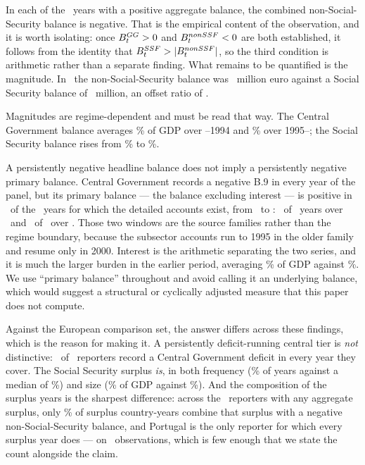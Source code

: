 In each of the \NumPositiveYears\ years with a positive aggregate balance, the
combined non-Social-Security balance is negative. That is the empirical content of
the observation, and it is worth isolating: once $B^{GG}_t > 0$ and $B^{nonSSF}_t < 0$
are both established, it follows from the identity that
$B^{SSF}_t > |B^{nonSSF}_t|$, so the third condition is arithmetic rather than a
separate finding. What remains to be quantified is the magnitude. In \LatestYear\ the
non-Social-Security balance was \LatestNonSsf\ million euro against a Social Security
balance of \LatestSsf\ million, an offset ratio of \LatestOffset.

Magnitudes are regime-dependent and must be read that way. The Central Government
balance averages \CentralMeanHistorical\% of GDP over \PanelStart--1994 and
\CentralMeanModern\% over 1995--\PanelEnd; the Social Security balance rises from
\SsfMeanHistorical\% to \SsfMeanModern\%.

A persistently negative headline balance does not imply a persistently negative
primary balance. Central Government records a negative B.9 in every year of the
panel, but its primary balance --- the balance excluding interest --- is positive in
\PrimaryPositiveYears\ of the \PrimaryObservedYears\ years for which the detailed
accounts exist, from \PrimaryPositiveFirst\ to \PrimaryPositiveLast:
\HistoricalPrimaryPositive\ of \HistoricalPrimaryYears\ years over
\HistoricalPrimaryWindow\ and \ModernPrimaryPositive\ of \ModernPrimaryYears\ over
\ModernPrimaryWindow. Those two windows are the source families rather than the regime
boundary, because the subsector accounts run to 1995 in the older family and resume only
in 2000. Interest is the arithmetic separating the two series, and it is much the larger
burden in the earlier period, averaging \HistoricalInterestMean\% of GDP against
\ModernInterestMean\%. We use
``primary balance'' throughout and avoid calling it an underlying balance, which
would suggest a structural or cyclically adjusted measure that this paper does not
compute.

Against the European comparison set, the answer differs across these findings, which is
the reason for making it. A persistently deficit-running central tier is \emph{not}
distinctive: \CentralAlwaysNegativeCountries\ of \BenchmarkCountries\ reporters record a
Central Government deficit in every year they cover. The Social Security surplus
\emph{is}, in both frequency (\PtSsfPositiveShare\% of years against a median of
\PtSsfShareMedian\%) and size (\PtSsfMeanPct\% of GDP against \PtSsfMeanMedian\%). And
the composition of the surplus years is the sharpest difference: across the
\CountriesWithSurplus\ reporters with any aggregate surplus, only
\SurplusOffsettingShare\% of surplus country-years combine that surplus with a negative
non-Social-Security balance, and Portugal is the only reporter for which every surplus
year does --- on \PtSurplusYears\ observations, which is few enough that we state the
count alongside the claim.

